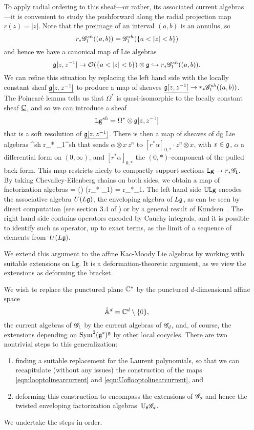To apply radial ordering to this sheaf---or rather, its associated current algebras---it is convenient to study the pushforward along the radial projection map $r(z) = |z|$.
Note that the preimage of an interval $(a,b)$ is an annulus, so
\[
r_* \mathscr G_1^{sh}((a,b)) = \mathscr G_1^{sh}(\{a < |z| < b\})
\]
and hence we have a canonical map of Lie algebras
\[
\mathfrak g[z,z^{-1}] \to \mathcal O(\{a < |z| < b\}) \otimes \mathfrak g \hookrightarrow r_* \mathscr G_1^{sh}((a,b)).
\]
We can refine this situation by replacing the left hand side with the locally constant sheaf $\underline{\mathfrak g[z,z^{-1}]}$ to produce a map of sheaves $\underline{\mathfrak g[z,z^{-1}]} \to  r_* \mathscr G_1^{sh}((a,b))$.
The Poincar\'e lemma tells us that $\Omega^*$ is quasi-isomorphic to the locally constant sheaf $\underline{\mathbb C}$,
and so we can introduce a sheaf
\[
\mathtt{Lg}^{sh} = \Omega^* \otimes \mathfrak g[z,z^{-1}]
\]
that is a soft resolution of $\underline{\mathfrak g[z,z^{-1}]}$.
There is then a map of sheaves of dg Lie algebras
\beqn
\label{eqn:looptolinearcurrent}
^{sh} \to r_* \sG_1^{sh}
\eeqn
that sends $\alpha \otimes x\, z^n$ to $[r^*\alpha]_{0,*} \cdot z^n \otimes x$, with $x \in \mathfrak g$, $\alpha$ a differential form on $(0,\infty)$, and $[r^*\alpha]_{0,*}$ the $(0,*)$-component of the pulled back form.
This map restricts nicely to compactly support sections $\mathtt{Lg} \to r_* \mathscr G_1$.
By taking Chevalley-Eilenberg chains on both sides, we obtain a map of factorization algebras
\beqn
\label{eqn:Uoflooptolinearcurrent}
\UU{} = \cliels() \to \cliels(r_* \sG_1) = r_*\UU\sG_1.
\eeqn
The left hand side $\mathbb U\mathtt{Lg}$ encodes the associative algebra $U(L\mathfrak g)$, the enveloping algebra of $L\mathfrak g$,
as can be seen by direct computation (see section 3.4 of \cite{CG1}) or by a general result of Knudsen~\cite{Knudsen}.
The right hand side contains operators encoded by Cauchy integrals, 
and it is possible to identify such as operator, up to exact terms, as the limit of a sequence of elements from~$U(L\mathfrak g)$.

We extend this argument to the affine Kac-Moody Lie algebras by working with suitable extensions on $\mathtt{Lg}$.
It is a deformation-theoretic argument, as we view the extensions as deforming the bracket.

We wish to replace the punctured plane $\mathbb C^*$ by the punctured $d$-dimensional affine space 
\[
\mathring{\mathbb A}^d = \mathbb C^d \setminus \{0\},
\] 
the current algebras of $\mathscr G_1$ by the current algebras of $\mathscr G_d$,
and, of course, the extensions depending on ${\rm Sym}^2(\mathfrak g^*)^\mathfrak g$ by other local cocycles.
There are two nontrivial steps to this generalization:
\begin{enumerate}
\item finding a suitable replacement for the Laurent polynomials, so that we can recapitulate (without any issues) the construction of the maps \eqref{eqn:looptolinearcurrent} and \eqref{eqn:Uoflooptolinearcurrent}, and
\item deforming this construction to encompass the extensions of $\mathscr G_d$ and hence the twisted enveloping factorization algebras~$\mathbb U_\theta \mathscr G_d$.
\end{enumerate}
We undertake the steps in order.

